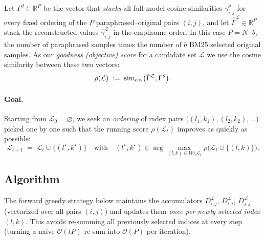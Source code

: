 Let $\Gamma^\theta \in \mathbb{R}^{P}$ be the vector that \emph{stacks} all full‑model cosine similarities $\gamma_{i,j}^{\theta}$ for every fixed ordering of the $P$ paraphrased–original pairs $(i,j)$, and let $\hat{\Gamma}^{\mathcal{L}} \in \mathbb{R}^{P}$ stack the reconstructed values $\hat{\gamma}^{\mathcal{L}}_{i,j}$ in the  emph{same} order. In this case $P = N \cdot b$, the number of paraphrased samples times the number of $b$ BM25 selected original samples. As our \emph{goodness (objective) score} for a candidate set $\mathcal{L}$ we use the cosine similarity between these two vectors:
\begin{equation}
\rho(\mathcal{L}) \;:=\;
\operatorname{sim}_{\cos}\bigl(\hat{\Gamma}^{\mathcal{L}}, \Gamma^\theta\bigr).
\label{eq:rho_objective}
\end{equation}

\paragraph{Goal.}
Starting from $\mathcal{L}_0=\varnothing$, we seek an \emph{ordering} of index pairs
$\bigl((l_1,k_1), (l_2,k_2), \dots\bigr)$ picked one by one such that the running score
$\rho(\mathcal{L}_t)$ improves as quickly as possible:
\[
\mathcal{L}_{t+1} \;=\; \mathcal{L}_t \cup \bigl\{(l^\star,k^\star)\bigr\}
\quad\text{with}\quad
(l^\star,k^\star) \in \arg\max_{(l,k)\in\mathcal{W}\setminus\mathcal{L}_t}
\rho\bigl(\mathcal{L}_t \cup \{(l,k)\}\bigr).
\]

\subsection{Algorithm}\label{subsec:gls_algo}
The forward greedy strategy below maintains the accumulators
$D^{\mathcal{L}}_{i,j}$, $D^{\mathcal{L}}_{i,i}$, $D^{\mathcal{L}}_{j,j}$ (vectorized over all pairs $(i,j)$) and
updates them \emph{once per newly selected index $(l,k)$}. This avoids re‑summing all previously
selected indices at every step (turning a naive $\mathcal{O}(tP)$ re‑sum into
$\mathcal{O}(P)$ per iteration).

